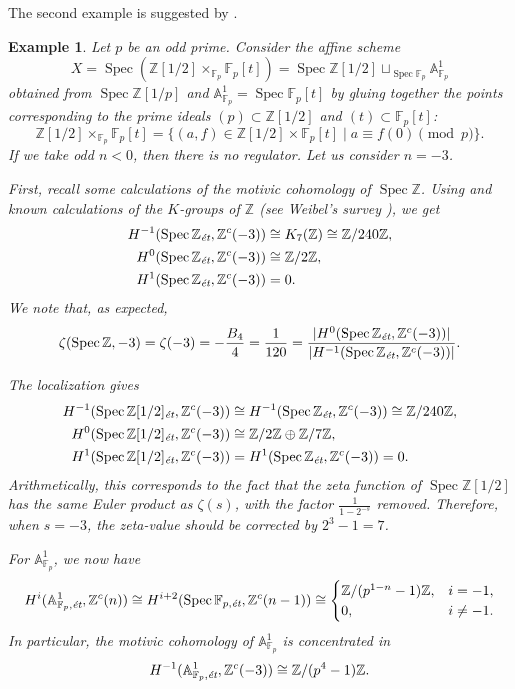 \documentclass[draft]{article}
\DeclareMathOperator{\Spec}{Spec}
\newcommand{\FF}{\mathbb{F}}
\newcommand{\ZZ}{\mathbb{Z}}
\renewcommand{\AA}{\mathbb{A}}
\newcommand{\et}{\text{\it \'{e}t}}
\theoremstyle{myplain}
\theoremstyle{mydefinition}
\newtheorem{example}[theorem]{Example}
\begin{document}
The second example is suggested by \cite[\S 7]{Jordan-Poonen-2020}.

\begin{example}
  Let $p$ be an odd prime. Consider the affine scheme
  \[ X = \Spec (\ZZ [1/2] \times_{\FF_p} \FF_p [t]) =
    \Spec \ZZ [1/2] \mathop{\sqcup}_{\Spec \FF_p} \AA^1_{\FF_p} \]
  obtained from $\Spec \ZZ [1/p]$ and $\AA^1_{\FF_p} = \Spec \FF_p [t]$ by
  gluing together the points corresponding to the prime ideals
  $(p) \subset \ZZ [1/2]$ and $(t) \subset \FF_p [t]$:
  \[ \ZZ [1/2] \times_{\FF_p} \FF_p [t] =
    \{ (a,f) \in \ZZ [1/2] \times \FF_p [t] \mid a \equiv f (0) \pmod{p} \}. \]
  If we take odd $n < 0$, then there is no regulator. Let us consider $n = -3$.

  First, recall some calculations of the motivic cohomology of $\Spec \ZZ$.
  Using \cite[Proposition~2.1]{Kolster-Sands-2008} and known calculations of the
  $K$-groups of $\ZZ$ (see Weibel's survey \cite{Weibel-2005}), we get
  \begin{align*}
    H^{-1} (\Spec \ZZ_\et, \ZZ^c (-3)) & \cong K_7 (\ZZ) \cong \ZZ/240\ZZ, \\
    H^0 (\Spec \ZZ_\et, \ZZ^c (-3)) & \cong \ZZ/2\ZZ, \\
    H^1 (\Spec \ZZ_\et, \ZZ^c (-3)) & = 0.
  \end{align*}
  We note that, as expected,
  \[ \zeta (\Spec \ZZ, -3) = \zeta (-3) = -\frac{B_4}{4} = \frac{1}{120} =
    \frac{|H^0 (\Spec \ZZ_\et, \ZZ^c (-3))|}{|H^{-1} (\Spec \ZZ_\et, \ZZ^c (-3))|}. \]

  The localization gives
  \begin{align*}
    H^{-1} (\Spec \ZZ [1/2]_\et, \ZZ^c (-3)) & \cong H^{-1} (\Spec \ZZ_\et, \ZZ^c (-3)) \cong \ZZ/240\ZZ, \\
    H^0 (\Spec \ZZ [1/2]_\et, \ZZ^c (-3)) & \cong \ZZ/2\ZZ \oplus \ZZ/7\ZZ, \\
    H^1 (\Spec \ZZ [1/2]_\et, \ZZ^c (-3)) & = H^1 (\Spec \ZZ_\et, \ZZ^c (-3)) = 0.
  \end{align*}
  Arithmetically, this corresponds to the fact that the zeta function of
  $\Spec \ZZ [1/2]$ has the same Euler product as $\zeta (s)$, with the factor
  $\frac{1}{1-2^{-s}}$ removed. Therefore, when $s = -3$, the zeta-value should
  be corrected by $2^3 - 1 = 7$.

  For $\AA^1_{\FF_p}$, we now have
  \[ H^i (\AA^1_{\FF_p, \et}, \ZZ^c (n)) \cong
    H^{i+2} (\Spec \FF_{p,\et}, \ZZ^c (n-1)) \cong
    \begin{cases}
      \ZZ/(p^{1-n} - 1)\ZZ, & i = -1, \\
      0, & i \ne -1.
    \end{cases} \]
  In particular, the motivic cohomology of $\AA^1_{\FF_p}$ is concentrated in
  \[ H^{-1} (\AA^1_{\FF_p, \et}, \ZZ^c (-3)) \cong \ZZ/(p^4-1)\ZZ. \]


\end{example}
\end{document}
